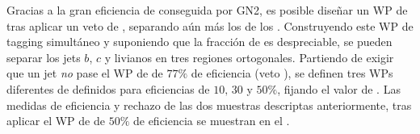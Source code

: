 Gracias a la gran eficiencia de \btagging conseguida por GN2, es posible diseñar un \ac{WP} de \ctagging tras aplicar un veto de \btagging, separando aún más los \cjets de los \ljets. Construyendo este \ac{WP} de tagging simultáneo y suponiendo que la fracción de \tjets es despreciable, se pueden separar los jets \(b\), \(c\) y livianos en tres regiones ortogonales. Partiendo de exigir que un jet \textit{no} pase el \ac{WP} de \btagging de \(77\%\) de eficiencia (veto \btag), se definen tres \acp{WP} diferentes de \ctagging definidos para eficiencias de \(10, \, 30\) y \(50\%\), fijando el valor de \gntc. Las medidas de eficiencia y rechazo de las dos muestras descriptas anteriormente, tras aplicar el \ac{WP} de \ctag de \(50\%\) de eficiencia se muestran en el \Tab{\ref{tab:objects:ftag:ctag_efficiency_original}}.

\begin{table}[ht!]
    \caption{Medidas de eficiencia de \ctagging para \cjets, y valores de rechazos de \bjets, \ljets y \tjets en los regímenes de bajo y alto \pt. Los valores corresponden a aquellos luego de aplicar el veto del \ac{WP} de \btagging de \(77\%\) y de \(50\%\)  de \ctagging. }
    \label{tab:objects:ftag:ctag_efficiency_original}
\end{table}